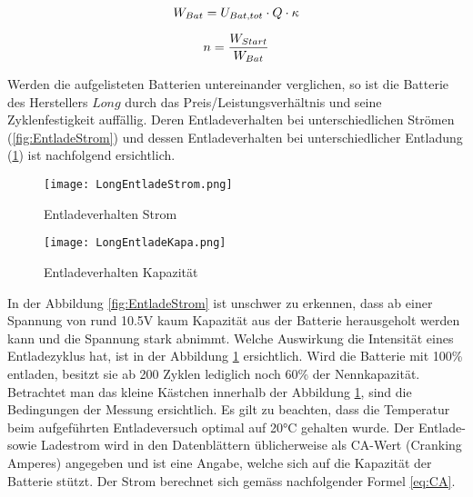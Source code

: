 \begin{equation}
\centering
	W_{Bat}=U_{Bat,tot}\cdot Q \cdot \kappa
\label{eq:EnergieBatterie}
\end{equation}

\begin{equation}
\centering
	n=\frac{W_{Start}}{W_{Bat}}
\label{eq:AnzahlStarts}
\end{equation}


Werden die aufgelisteten Batterien untereinander verglichen, so ist die Batterie des Herstellers $Long$ durch das Preis/Leistungsverhältnis und seine Zyklenfestigkeit auffällig. Deren Entladeverhalten bei unterschiedlichen Strömen (\ref{fig:EntladeStrom}) und dessen Entladeverhalten bei unterschiedlicher Entladung (\ref{fig:EntladeKapazität}) ist nachfolgend ersichtlich. 


\begin{figure}[H]
	\centering
	\begin{minipage}[h]{.48\linewidth} %
		\centering
		\texttt{[image: LongEntladeStrom.png]}
		\caption[Batterie Entladeverhalten Strom]{Entladeverhalten Strom}
		\label{fig:EntladeStrom}
	\end{minipage}
	\quad %
	\begin{minipage}[h]{.48\linewidth} %
		\centering
		\texttt{[image: LongEntladeKapa.png]}
		\caption[Batterie Entladeverhalten Kapazität]{Entladeverhalten Kapazität}
		\label{fig:EntladeKapazität}
	\end{minipage}
\end{figure}

In der Abbildung \ref{fig:EntladeStrom} ist unschwer zu erkennen, dass ab einer Spannung von rund 10.5V kaum Kapazität aus der Batterie herausgeholt werden kann und die Spannung stark abnimmt. Welche Auswirkung die Intensität eines Entladezyklus hat, ist in der Abbildung \ref{fig:EntladeKapazität} ersichtlich. Wird die Batterie mit 100\% entladen, besitzt sie ab 200 Zyklen lediglich noch 60\% der Nennkapazität. Betrachtet man das kleine Kästchen innerhalb der Abbildung \ref{fig:EntladeKapazität}, sind die Bedingungen der Messung ersichtlich. Es gilt zu beachten, dass die Temperatur beim aufgeführten Entladeversuch optimal auf 20°C gehalten wurde. Der Entlade- sowie Ladestrom wird in den Datenblättern üblicherweise als CA-Wert (Cranking Amperes) angegeben und ist eine Angabe, welche sich auf die Kapazität der Batterie stützt. Der Strom berechnet sich gemäss nachfolgender Formel \ref{eq:CA}.

